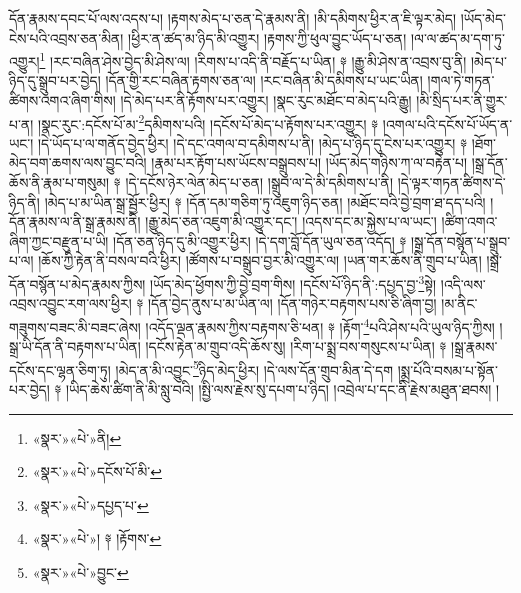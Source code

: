 དོན་རྣམས་དབང་པོ་ལས་འདས་པ། །རྟགས་མེད་པ་ཅན་དེ་རྣམས་ནི། །མི་དམིགས་ཕྱིར་ན་ཇི་ལྟར་མེད། །ཡོད་མེད་ངེས་པའི་འབྲས་ཅན་མིན། །ཕྱིར་ན་ཚད་མ་ཉིད་མི་འགྱུར། །རྟགས་ཀྱི་ཕུལ་བྱུང་ཡོད་པ་ཅན། །ལ་ལ་ཚད་མ་དག་ཏུ་འགྱུར།\footnote{«སྣར་»«པེ་»ནི།} །རང་བཞིན་ཤེས་བྱེད་མི་ཤེས་ལ། །རིགས་པ་འདི་ནི་བརྗོད་པ་ཡིན། ༈ །རྒྱུ་མི་ཤེས་ན་འབྲས་བུ་ནི། །མེད་པ་ཉིད་དུ་སྒྲུབ་པར་བྱེད། །དོན་གྱི་རང་བཞིན་རྟགས་ཅན་ལ། །རང་བཞིན་མི་དམིགས་པ་ཡང་ཡིན། །གལ་ཏེ་གཏན་ཚིགས་འགའ་ཞིག་གིས། །དེ་མེད་པར་ནི་རྟོགས་པར་འགྱུར། །སྣང་རུང་མཐོང་བ་མེད་པའི་རྒྱུ། །མི་སྲིད་པར་ནི་གྱུར་པ་ན། །སྣང་རུང་:དངོས་པོ་མ་\footnote{«སྣར་»«པེ་»དངོས་པོ་མི་}དམིགས་པའི། །དངོས་པོ་མེད་པ་རྟོགས་པར་འགྱུར། ༈ །འགལ་པའི་དངོས་པོ་ཡོད་ན་ཡང་། །དེ་ཡོད་པ་ལ་གནོད་བྱེད་ཕྱིར། །དེ་དང་འགལ་བ་དམིགས་པ་ནི། །མེད་པ་ཉིད་དུ་ངེས་པར་འགྱུར། ༈ །ཐོག་མེད་བག་ཆགས་ལས་བྱུང་བའི། །རྣམ་པར་རྟོག་པས་ཡོངས་བསྒྲུབས་པ། །ཡོད་མེད་གཉིས་ཀ་ལ་བརྟེན་པ། །སྒྲ་དོན་ཆོས་ནི་རྣམ་པ་གསུམ། ༈ །དེ་དངོས་ཉེར་ལེན་མེད་པ་ཅན། །སྒྲུབ་ལ་དེ་མི་དམིགས་པ་ནི། །དེ་ལྟར་གཏན་ཚིགས་དེ་ཉིད་ནི། །མེད་པ་མ་ཡིན་སྒྲ་སྦྱོར་ཕྱིར། ༈ །དོན་དམ་གཅིག་ཏུ་འཇུག་ཉིད་ཅན། །མཐོང་བའི་བྱེ་བྲག་ཐ་དད་པའི། །དོན་རྣམས་ལ་ནི་སྒྲ་རྣམས་ནི། །རྒྱུ་མེད་ཅན་འཇུག་མི་འགྱུར་དང་། །འདས་དང་མ་སྐྱེས་པ་ལ་ཡང་། །ཚིག་འགའ་ཞིག་ཀྱང་བརྫུན་པ་ཡི། །དོན་ཅན་ཉིད་དུ་མི་འགྱུར་ཕྱིར། །དེ་དག་བློ་དོན་ཡུལ་ཅན་འདོད། ༈ །སྒྲ་དོན་བསྙོན་པ་སྒྲུབ་པ་ལ། །ཆོས་ཀྱི་རྟེན་ནི་བསལ་བའི་ཕྱིར། །ཚོགས་པ་བསྒྲུབ་བྱར་མི་འགྱུར་ལ། །ཡན་གར་ཆོས་ནི་གྲུབ་པ་ཡིན། །སྒྲ་དོན་བསྙོན་པ་མེད་རྣམས་ཀྱིས། །ཡོད་མེད་ཕྱོགས་ཀྱི་བྱེ་བྲག་གིས། །དངོས་པོ་ཉིད་ནི་:དཔྱད་བྱ་\footnote{«སྣར་»«པེ་»དཔྱད་པ་}སྟེ། །འདི་ལས་འབྲས་འབྱུང་རག་ལས་ཕྱིར། ༈ །དོན་བྱེད་ནུས་པ་མ་ཡིན་ལ། །དོན་གཉེར་བརྟགས་པས་ཅི་ཞིག་བྱ། །མ་ནིང་གཟུགས་བཟང་མི་བཟང་ཞེས། །འདོད་ལྡན་རྣམས་ཀྱིས་བརྟགས་ཅི་ཕན། ༈ །རྟོག་\footnote{«སྣར་»«པེ་»། ༈ །རྟོགས་}པའི་ཤེས་པའི་ཡུལ་ཉིད་ཀྱིས། །སྒྲ་ཡི་དོན་ནི་བརྟགས་པ་ཡིན། །དངོས་རྟེན་མ་གྲུབ་འདི་ཆོས་སུ། །རིག་པ་སྨྲ་བས་གསུངས་པ་ཡིན། ༈ །སྒྲ་རྣམས་དངོས་དང་ལྷན་ཅིག་ཏུ། །མེད་ན་མི་འབྱུང་\footnote{«སྣར་»«པེ་»བྱུང་}ཉིད་མེད་ཕྱིར། །དེ་ལས་དོན་གྲུབ་མིན་དེ་དག །སྨྲ་པོའི་བསམ་པ་སྟོན་པར་བྱེད། ༈ །ཡིད་ཆེས་ཚིག་ནི་མི་སླུ་བའི། །སྤྱི་ལས་རྗེས་སུ་དཔག་པ་ཉིད། །འབྲེལ་པ་དང་ནི་རྗེས་མཐུན་ཐབས། །
